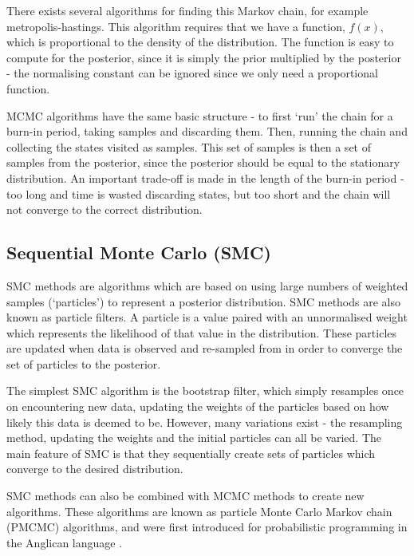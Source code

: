 There exists several algorithms for finding this Markov chain, for example metropolis-hastings. This algorithm requires that we have a function, $f(x)$, which is proportional to the density of the distribution. The function is easy to compute for the posterior, since it is simply the prior multiplied by the posterior - the normalising constant can be ignored since we only need a proportional function.

MCMC algorithms have the same basic structure - to first `run' the chain for a burn-in period, taking samples and discarding them. Then, running the chain and collecting the states visited as samples. This set of samples is then a set of samples from the posterior, since the posterior should be equal to the stationary distribution. An important trade-off is made in the length of the burn-in period - too long and time is wasted discarding states, but too short and the chain will not converge to the correct distribution.

\subsection{Sequential Monte Carlo (SMC)}

SMC methods are algorithms which are based on using large numbers of weighted samples (`particles') to represent a posterior distribution. SMC methods are also known as particle filters. A particle is a value paired with an unnormalised weight which represents the likelihood of that value in the distribution. These particles are updated when data is observed and re-sampled from in order to converge the set of particles to the posterior.

The simplest SMC algorithm is the bootstrap filter\cite{particlefilter}, which simply resamples once on encountering new data, updating the weights of the particles based on how likely this data is deemed to be. However, many variations exist - the resampling method, updating the weights and the initial particles can all be varied. The main feature of SMC is that they sequentially create sets of particles which converge to the desired distribution.

SMC methods can also be combined with MCMC methods to create new algorithms. These algorithms are known as particle Monte Carlo Markov chain (PMCMC) algorithms, and were first introduced for probabilistic programming in the Anglican language \cite{anglican-smc}.